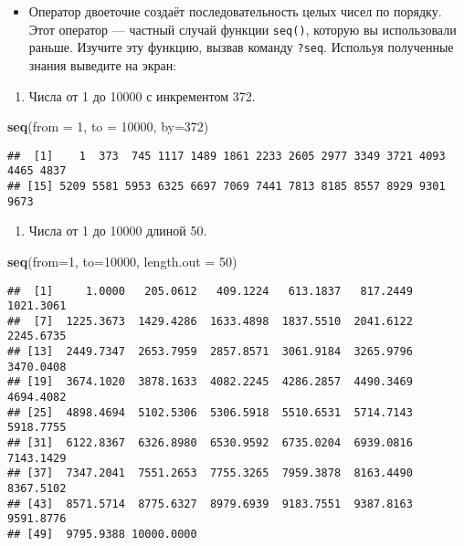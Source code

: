 \documentclass[]{article}
\newenvironment{Shaded}{\begin{snugshade}}{\end{snugshade}}
\newcommand{\KeywordTok}[1]{\textcolor[rgb]{0.13,0.29,0.53}{\textbf{#1}}}
\newcommand{\DataTypeTok}[1]{\textcolor[rgb]{0.13,0.29,0.53}{#1}}
\newcommand{\DecValTok}[1]{\textcolor[rgb]{0.00,0.00,0.81}{#1}}
\newcommand{\NormalTok}[1]{#1}
\providecommand{\tightlist}{%
  \setlength{\itemsep}{0pt}\setlength{\parskip}{0pt}}
\begin{document}
\begin{itemize}
\tightlist
\item
  Оператор двоеточие создаёт последовательность целых чисел по порядку.
  Этот оператор --- частный случай функции \texttt{seq()}, которую вы
  использовали раньше. Изучите эту функцию, вызвав команду
  \texttt{?seq}. Испольуя полученные знания выведите на экран:
\end{itemize}

\begin{enumerate}
\def\labelenumi{\arabic{enumi}.}
\tightlist
\item
  Числа от 1 до 10000 с инкрементом 372.
\end{enumerate}

\begin{Shaded}
\begin{Highlighting}[]
\KeywordTok{seq}\NormalTok{(}\DataTypeTok{from =} \DecValTok{1}\NormalTok{, }\DataTypeTok{to =} \DecValTok{10000}\NormalTok{, }\DataTypeTok{by=}\DecValTok{372}\NormalTok{)}
\end{Highlighting}
\end{Shaded}

\begin{verbatim}
##  [1]    1  373  745 1117 1489 1861 2233 2605 2977 3349 3721 4093 4465 4837
## [15] 5209 5581 5953 6325 6697 7069 7441 7813 8185 8557 8929 9301 9673
\end{verbatim}

\begin{enumerate}
\def\labelenumi{\arabic{enumi}.}
\setcounter{enumi}{1}
\tightlist
\item
  Числа от 1 до 10000 длиной 50.
\end{enumerate}

\begin{Shaded}
\begin{Highlighting}[]
\KeywordTok{seq}\NormalTok{(}\DataTypeTok{from=}\DecValTok{1}\NormalTok{, }\DataTypeTok{to=}\DecValTok{10000}\NormalTok{, }\DataTypeTok{length.out =} \DecValTok{50}\NormalTok{)}
\end{Highlighting}
\end{Shaded}

\begin{verbatim}
##  [1]     1.0000   205.0612   409.1224   613.1837   817.2449  1021.3061
##  [7]  1225.3673  1429.4286  1633.4898  1837.5510  2041.6122  2245.6735
## [13]  2449.7347  2653.7959  2857.8571  3061.9184  3265.9796  3470.0408
## [19]  3674.1020  3878.1633  4082.2245  4286.2857  4490.3469  4694.4082
## [25]  4898.4694  5102.5306  5306.5918  5510.6531  5714.7143  5918.7755
## [31]  6122.8367  6326.8980  6530.9592  6735.0204  6939.0816  7143.1429
## [37]  7347.2041  7551.2653  7755.3265  7959.3878  8163.4490  8367.5102
## [43]  8571.5714  8775.6327  8979.6939  9183.7551  9387.8163  9591.8776
## [49]  9795.9388 10000.0000
\end{verbatim}
\end{document}
